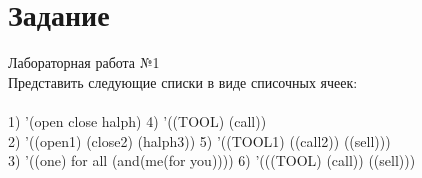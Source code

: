 \newpage
\section*{Задание}
\Large{Лабораторная работа №1}\\

\large{Представить следующие списки в виде списочных ячеек:}\\
\\
1) '(open close halph) \hspace{5cm}4) '((TOOL) (call))\\
2) '((open1) (close2) (halph3)) \hspace{3.4cm}5) '((TOOL1) ((call2)) ((sell)))\\
3) '((one) for all (and(me(for you)))) \hspace{2.3cm}6) '(((TOOL) (call)) ((sell)))\\


\begin{minipage}[t]{1.0\textwidth}
  \centering{}
  \label{fig1}
\end{minipage}\hfill

\begin{minipage}[t]{1.0\textwidth}
  \centering{}
  \label{fig2}
\end{minipage}\hfill

\begin{minipage}[t]{1.0\textwidth}
  \centering{}
  \label{fig3}
\end{minipage}\hfill

\begin{minipage}[t]{1.0\textwidth}
  \centering{}
  \label{fig4}
\end{minipage}\hfill

\begin{minipage}[t]{1.0\textwidth}
  \centering{}
  \label{fig5}
\end{minipage}\hfill

\begin{minipage}[t]{1.0\textwidth}
  \centering{}
  \label{fig6}
\end{minipage}\hfill

